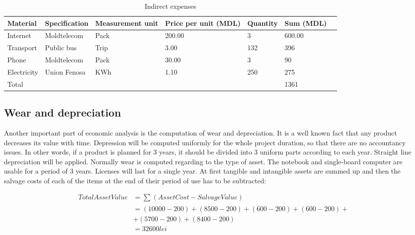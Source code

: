 \documentclass[12pt,a4paper]{report}
\begin{document}
\begin{table}[!h]
\begin{center}
\begin{tabular}{| M{5em} | M{10em} | M{7em} | M{5em} | M{5em} | M{5em} |N}
\hline
\textbf{Material} & \textbf{Specification} & \textbf{Measurement unit} & \textbf{Price per unit (MDL)} & \textbf{Quantity} & \textbf{Sum (MDL)} &\\[18pt]
\hline
Internet & Moldtelecom & Pack & 200.00 & 3 & 600.00 &\\[14pt]
\hline
Transport & Public bus & Trip & 3.00 & 132 & 396 &\\[14pt]
\hline
Phone & Moldtelecom & Pack & 30.00 & 3 & 90 &\\[14pt]
\hline
Electricity & Union Fenosa & KWh & 1.10 & 250 & 275 &\\[14pt]
\hline
Total & & & & & 1361 &\\[14pt]
\hline
\end{tabular}
\caption{Indirect expenses}
\label{table:indirect_expenses}
\end{center}
\end{table}

\subsection{Wear and depreciation}
Another important part of economic analysis is the computation of wear and depreciation. It is a well known fact that any product decreases its value with time. Depression will be computed uniformly for the whole project duration, so that there are no accountancy issues. In other words, if a product is planned for 3 years, it should be divided into 3 uniform parts according to each year. Straight line depreciation will be applied. Normally wear is computed regarding to the type of asset. The notebook and single-board computer are usable for a period of 3 years. Licenses will last for a single year. At first tangible and intangible assets are summed up and then the salvage costs of each of the items at the end of their period of use has to be subtracted:

\begin{equation}
 \begin{split}
  Total Asset Value &= \sum_{} (AssetCost - Salvage Value) \\
		    &= (10000 - 200) + (8500 - 200) + (600 - 200) + (600 - 200) +\\
		    & + (5700 - 200) + (8400 - 200) \\
		    &= 32600 lei
 \end{split}
\end{equation}
\end{document}
